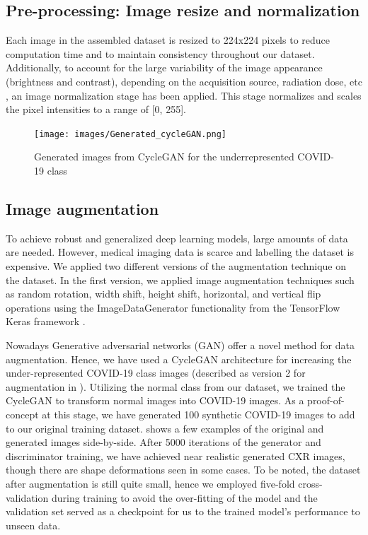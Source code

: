   
\subsection{Pre-processing: Image resize and normalization}

 Each image in the assembled dataset is resized to 224x224 pixels to reduce computation time and to maintain consistency throughout our dataset. Additionally, to account for the large variability of the image appearance (brightness and contrast), depending on the acquisition source, radiation dose, etc \cite{guendel2019multi, stephen2019efficient}, an image normalization stage has been applied. This stage normalizes and scales the pixel intensities to a range of [0, 255]. 


\begin{figure} [h!]
\centering 
\texttt{[image: images/Generated\_cycleGAN.png]}
   \caption{ Generated images from CycleGAN for the underrepresented COVID-19 class}
\label{fig:gan}
\end{figure}
\subsection{Image augmentation}
To achieve robust and generalized deep learning models, large amounts of data are needed. However, medical imaging data is scarce and labelling the dataset is expensive. We applied two different versions of the augmentation technique on the dataset. In the first version, we applied image augmentation techniques \cite{shorten2019survey} such as random rotation, width shift, height shift, horizontal, and vertical flip operations using the ImageDataGenerator functionality from the TensorFlow Keras framework \cite{chollet2018introduction, gulli2017deep}. 

Nowadays Generative adversarial networks (GAN) offer a novel method for data augmentation. Hence, we have used a CycleGAN \cite{zhu2017unpaired} architecture for increasing the under-represented COVID-19 class images (described as version 2 for augmentation in ).  Utilizing the normal class from our dataset, we trained the CycleGAN to transform normal images into COVID-19 images. As a proof-of-concept at this stage, we have generated 100 synthetic COVID-19 images to add to our original training dataset.  shows a few examples of the original and generated images side-by-side. After 5000 iterations of the generator and discriminator training, we have achieved near realistic generated CXR images, though there are shape deformations seen in some cases. To be noted, the dataset after augmentation is still quite small, hence we employed five-fold cross-validation during training to avoid the over-fitting
of the model and the validation set served as a checkpoint for us to the trained model's performance to unseen data.



